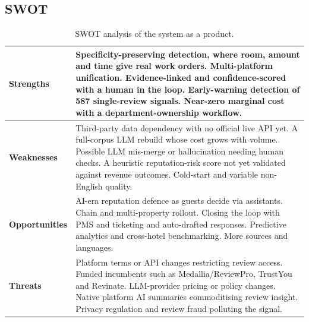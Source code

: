 \documentclass[11pt,a4paper]{article}
\begin{document}
\subsection{SWOT}
\begin{table}[H]
\centering
\caption{SWOT analysis of the system as a product.}
\label{tab:swot}
\renewcommand{\arraystretch}{1.2}
\begin{tabularx}{\linewidth}{>{\bfseries}p{2.35cm}X}
\toprule
Strengths & Specificity-preserving detection, where room, amount and time give real work orders.
Multi-platform unification. Evidence-linked and confidence-scored with a human in the loop. Early-warning
detection of 587 single-review signals. Near-zero marginal cost with a department-ownership workflow. \\
\midrule
Weaknesses & Third-party data dependency with no official live API yet. A full-corpus LLM rebuild whose
cost grows with volume. Possible LLM mis-merge or hallucination needing human checks. A heuristic
reputation-risk score not yet validated against revenue outcomes. Cold-start and variable non-English
quality. \\
\midrule
Opportunities & AI-era reputation defence as guests decide via assistants. Chain and multi-property
rollout. Closing the loop with PMS and ticketing and auto-drafted responses. Predictive analytics and
cross-hotel benchmarking. More sources and languages. \\
\midrule
Threats & Platform terms or API changes restricting review access. Funded incumbents such as
Medallia/ReviewPro, TrustYou and Revinate. LLM-provider pricing or policy changes. Native platform AI
summaries commoditising review insight. Privacy regulation and review fraud polluting the signal. \\
\bottomrule
\end{tabularx}
\end{table}
\end{document}
